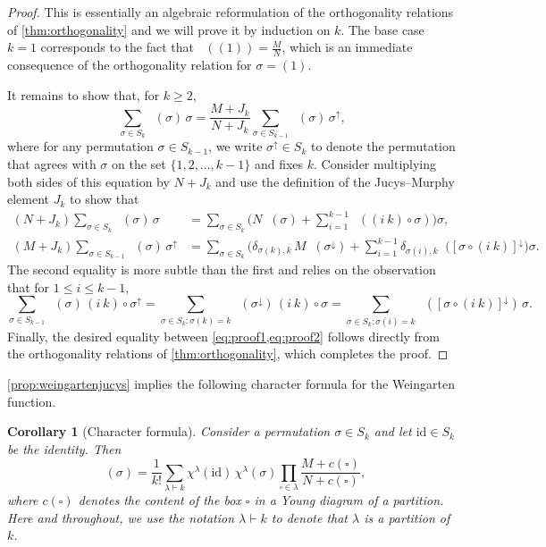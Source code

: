 \documentclass[a4paper]{article}
\theoremstyle{plain}
\newtheorem{corollary}[theorem]{Corollary}
\numberwithin{theorem}{section}
\theoremstyle{definition}
\theoremstyle{remark}
\renewcommand{\leq}{\leqslant}
\renewcommand{\geq}{\geqslant}
\newcommand{\SM}{\mathbf{S}}			%
\DeclareMathOperator{\SW}{Wg^{\SM}}		%
\newcommand{\SG}{S} 					%
\begin{document}
 
\begin{proof}
This is essentially an algebraic reformulation of the orthogonality relations of \cref{thm:orthogonality} and we will prove it by induction on $k$. The base case $k=1$ corresponds to the fact that $\SW((1)) = \frac{M}{N}$, which is an immediate consequence of the orthogonality relation for $\sigma = (1)$.


It remains to show that, for $k \geq 2$,
\[
\sum_{\sigma\in \SG_k} \SW(\sigma) \, \sigma =\frac{M+J_k}{N+J_k} \sum_{\sigma\in \SG_{k-1}} \SW(\sigma) \, \sigma^{\uparrow},
\]
where for any permutation $\sigma \in \SG_{k-1}$, we write $\sigma^\uparrow \in \SG_k$ to denote the permutation that agrees with $\sigma$ on the set $\{1, 2, \ldots, k-1\}$ and fixes $k$. Consider multiplying both sides of this equation by $N+J_k$ and use the definition of the Jucys--Murphy element $J_k$ to show that
\begin{align}
(N + J_k) \sum_{\sigma \in \SG_k} \SW(\sigma) \, \sigma &= \sum_{\sigma \in \SG_k} \bigg( N\SW(\sigma) + \sum_{i=1}^{k-1} \SW((i ~ k) \circ \sigma) \bigg) \sigma, \label{eq:proof1} \\
(M+J_k) \sum_{\sigma \in \SG_{k-1}} \SW(\sigma) \, \sigma^{\uparrow} &= \sum_{\sigma \in \SG_k}\bigg( \delta_{\sigma(k),k} \, M \SW(\sigma^\downarrow) + \sum_{i=1}^{k-1} \delta_{\sigma(i),k} \SW( [\sigma \circ (i ~ k)]^\downarrow \bigg) \sigma. \label{eq:proof2}
\end{align}
The second equality is more subtle than the first and relies on the observation that for $1 \leq i \leq k-1$,
\[
\sum_{\sigma\in \SG_{k-1}} \SW(\sigma) \, (i ~ k) \circ \sigma^{\uparrow} = \sum_{\sigma \in \SG_k : \sigma(k) = k} \SW(\sigma^\downarrow) \, (i ~ k) \circ \sigma = \sum_{\sigma \in \SG_k : \sigma(i) = k} \SW([ \sigma\circ (i ~ k)]^\downarrow) \, \sigma.
\]
Finally, the desired equality between \cref{eq:proof1,eq:proof2} follows directly from the orthogonality relations of \cref{thm:orthogonality}, which completes the proof.
\end{proof}


\cref{prop:weingartenjucys} implies the following character formula for the Weingarten function.


\begin{corollary}[Character formula] \label{cor:characterformula}
Consider a permutation $\sigma\in S_k$ and let $\mathrm{id} \in S_k$ be the identity. Then
\[
\SW(\sigma) = \frac{1}{k!} \sum_{\lambda \vdash k} \chi^\lambda(\mathrm{id}) \, \chi^\lambda(\sigma) \prod_{\square \in \lambda} \frac{M+c(\square)}{N+c(\square)},
\]
where $c(\square)$ denotes the content of the box $\square$ in a Young diagram of a partition. Here and throughout, we use the notation $\lambda \vdash k$ to denote that $\lambda$ is a partition of $k$.
\end{corollary}
\end{document}
